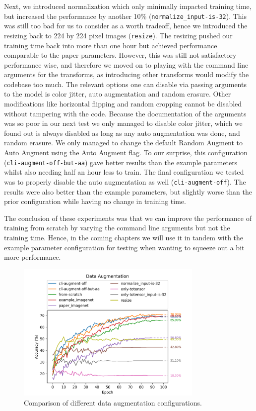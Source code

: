 \documentclass{article}
\begin{document}
Next, we introduced normalization which only minimally impacted training time, but increased the performance by another 10\% (\texttt{normalize\_input-is-32}).
This was still too bad for us to consider as a worth tradeoff, hence we introduced the resizing back to 224 by 224 pixel images (\texttt{resize}).
The resizing pushed our training time back into more than one hour but achieved performance comparable to the paper parameters.
However, this was still not satisfactory performance wise, and therefore we moved on to playing with the command line arguments for the transforms, as introducing other transforms would modify the codebase too much.
The relevant options one can disable via passing arguments to the model is color jitter, auto augmentation and random erasure.
Other modifications like horizontal flipping and random cropping cannot be disabled without tampering with the code.
Because the documentation of the arguments was so poor in our next test we only managed to disable color jitter, which we found out is always disabled as long as any auto augmentation was done, and random erasure.
We only managed to change the default Random Augment to Auto Augment using the Auto Augment flag.
To our surprise, this configuration (\texttt{cli-augment-off-but-aa}) gave better results than the example parameters whilst also needing half an hour less to train.
The final configuration we tested was to properly disable the auto augmentation as well (\texttt{cli-augment-off}).
The results were also better than the example parameters, but slightly worse than the prior configuration while having no change in training time.

The conclusion of these experiments was that we can improve the performance of training from scratch by varying the command line arguments but not the training time.
Hence, in the coming chapters we will use it in tandem with the example parameter configuration for testing when wanting to squeeze out a bit more performance.
\begin{figure}[h]
    \centering
    \includegraphics[width=0.8\textwidth]{images/data_augmentation}
    \caption{Comparison of different data augmentation configurations.}
    \label{fig:data-augmentation}
\end{figure}
\end{document}
